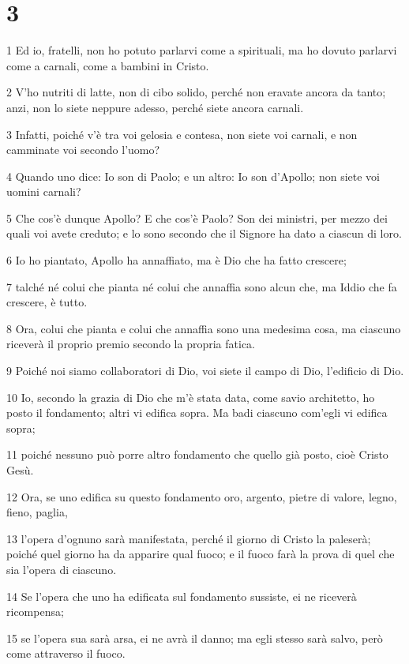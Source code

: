 \chapter{3}

\par 1 Ed io, fratelli, non ho potuto parlarvi come a spirituali, ma ho dovuto parlarvi come a carnali, come a bambini in Cristo.
\par 2 V'ho nutriti di latte, non di cibo solido, perché non eravate ancora da tanto; anzi, non lo siete neppure adesso, perché siete ancora carnali.
\par 3 Infatti, poiché v'è tra voi gelosia e contesa, non siete voi carnali, e non camminate voi secondo l'uomo?
\par 4 Quando uno dice: Io son di Paolo; e un altro: Io son d'Apollo; non siete voi uomini carnali?
\par 5 Che cos'è dunque Apollo? E che cos'è Paolo? Son dei ministri, per mezzo dei quali voi avete creduto; e lo sono secondo che il Signore ha dato a ciascun di loro.
\par 6 Io ho piantato, Apollo ha annaffiato, ma è Dio che ha fatto crescere;
\par 7 talché né colui che pianta né colui che annaffia sono alcun che, ma Iddio che fa crescere, è tutto.
\par 8 Ora, colui che pianta e colui che annaffia sono una medesima cosa, ma ciascuno riceverà il proprio premio secondo la propria fatica.
\par 9 Poiché noi siamo collaboratori di Dio, voi siete il campo di Dio, l'edificio di Dio.
\par 10 Io, secondo la grazia di Dio che m'è stata data, come savio architetto, ho posto il fondamento; altri vi edifica sopra. Ma badi ciascuno com'egli vi edifica sopra;
\par 11 poiché nessuno può porre altro fondamento che quello già posto, cioè Cristo Gesù.
\par 12 Ora, se uno edifica su questo fondamento oro, argento, pietre di valore, legno, fieno, paglia,
\par 13 l'opera d'ognuno sarà manifestata, perché il giorno di Cristo la paleserà; poiché quel giorno ha da apparire qual fuoco; e il fuoco farà la prova di quel che sia l'opera di ciascuno.
\par 14 Se l'opera che uno ha edificata sul fondamento sussiste, ei ne riceverà ricompensa;
\par 15 se l'opera sua sarà arsa, ei ne avrà il danno; ma egli stesso sarà salvo, però come attraverso il fuoco.
